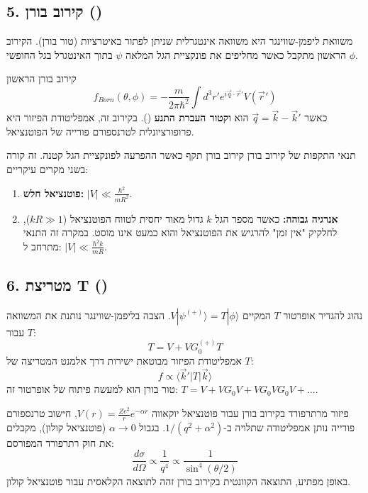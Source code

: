 \subsection*{5. קירוב בורן ()}
משוואת ליפמן-שווינגר היא משוואה אינטגרלית שניתן לפתור באיטרציות (טור בורן). הקירוב הראשון מתקבל כאשר מחליפים את פונקציית הגל המלאה $\psi$ בתוך האינטגרל בגל החופשי $\phi$.

\begin{resultbox}{קירוב בורן הראשון}
$$f_{Born}(\theta, \phi) = -\frac{m}{2\pi \hbar^2} \int d^3r' e^{i\vec{q}\cdot\vec{r}'} V(\vec{r}')$$
כאשר $\vec{q} = \vec{k} - \vec{k}'$ הוא \textbf{וקטור העברת התנע} (). בקירוב זה, אמפליטודת הפיזור היא פרופורציונלית לטרנספורם פורייה של הפוטנציאל.
\end{resultbox}

\begin{notebox}{תנאי התקפות של קירוב בורן}
קירוב בורן תקף כאשר ההפרעה לפונקציית הגל קטנה. זה קורה בשני מקרים עיקריים:
\begin{enumerate}
    \item \textbf{פוטנציאל חלש:} $|V| \ll \frac{\hbar^2}{m R^2}$.
    \item \textbf{אנרגיה גבוהה:} כאשר מספר הגל $k$ גדול מאוד יחסית לטווח הפוטנציאל ($kR \gg 1$), לחלקיק "אין זמן" להרגיש את הפוטנציאל והוא כמעט אינו מוסט. במקרה זה התנאי מתרחב ל: $|V| \ll \frac{\hbar^2 k}{m R}$.
\end{enumerate}
\end{notebox}

\subsection*{6. מטריצת T ()}
נהוג להגדיר אופרטור $T$ המקיים $V |\psi^{(+)}\rangle = T |\phi\rangle$. הצבה בליפמן-שווינגר נותנת את המשוואה עבור $T$:
$$T = V + V G_0^{(+)} T$$
אמפליטודת הפיזור מבוטאת ישירות דרך אלמנט המטריצה של $T$:
$$f \propto \langle \vec{k}' | T | \vec{k} \rangle$$
טור בורן הוא למעשה פיתוח של אופרטור זה: $T = V + V G_0 V + V G_0 V G_0 V + \dots$.

\begin{examplebox}{פיזור מרתרפורד בקירוב בורן}
עבור פוטנציאל יוקאווה $V(r) = \frac{Ze^2}{r} e^{-\alpha r}$, חישוב טרנספורם פורייה נותן אמפליטודה שתלויה ב-$1/(q^2 + \alpha^2)$. בגבול $\alpha \to 0$ (פוטנציאל קולון), מקבלים את חוק רתרפורד המפורסם:
$$\frac{d\sigma}{d\Omega} \propto \frac{1}{q^4} \propto \frac{1}{\sin^4(\theta/2)}$$
באופן מפתיע, התוצאה הקוונטית בקירוב בורן זהה לתוצאה הקלאסית עבור פוטנציאל קולון.
\end{examplebox}












